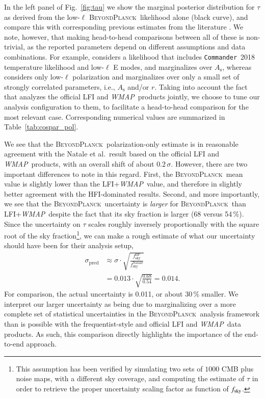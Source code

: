 \documentclass[twocolumn]{aa}
\def\WMAP{\textit{WMAP}}
\def\commander{\texttt{Commander}}
\newcommand{\BP}{\textsc{BeyondPlanck}}
\begin{document}
In the left panel of Fig.~\ref{fig:tau} we show the marginal posterior
distribution for $\tau$ as derived from the low-$\ell$ \BP\ likelihood
alone (black curve), and compare this with corresponding previous
estimates from the literature \citep{hinshaw2012, planck2016-l06,
  natale:2020,pagano:2020}. We note, however, that making head-to-head
comparisons between all of these is non-trivial, as the reported
parameters depend on different assumptions and data combinations. For
example, \citet{pagano:2020} considers a likelihood that includes
\commander\ 2018 temperature likelihood and low-$\ell$ E modes, 
and marginalizes over $A_{\mathrm{s}}$, whereas \citet{natale:2020} considers only
low-$\ell$ polarization and marginalizes over only a small set of
strongly correlated parameters, i.e., $A_{\mathrm{s}}$ and/or
$r$. Taking into account the fact that \citet{natale:2020} analyzes
the official LFI and \WMAP\ products jointly, we choose to tune our
analysis configuration to them, to facilitate a head-to-head
comparison for the most relevant case. Corresponding numerical values
are summarized in Table~\ref{tab:cospar_pol}.

We see that the \BP\ polarization-only estimate is in reasonable
agreement with the Natale et al.\ result based on the official LFI and
\WMAP\ products, with an overall shift of about
$0.2\,\sigma$. However, there are two important differences to note in
this regard. First, the \BP\ mean value is slightly lower than the
LFI+\WMAP\ value, and therefore in slightly better agreement with the
HFI-dominated results. Second, and more importantly, we see that the
\BP\ uncertainty is \emph{larger} for \BP\ than LFI+\WMAP\, despite
the fact that its sky fraction is larger (68 versus 54\,\%). Since the
uncertainty on $\tau$ scales roughly inversely proportionally with the
square root of the sky fraction\footnote{This assumption has been verified
by simulating two sets of $1000$ CMB plus noise maps, with a different
sky coverage, and computing the estimate of $\tau$ in order to retrieve
the proper uncertainty scaling factor as function of $f_{\rm{sky}}$.}, we can
make a rough estimate of what our uncertainty should have been for
their analysis setup,
\begin{align}
  \sigma_{\mathrm{pred}} &\approx
  \sigma\cdot\sqrt{\frac{f_{\mathrm{sky}}^{\mathrm{BP}}}{f_{\mathrm{sky}}^{\mathrm{Natale}}}}\\\
  &= 0.013\cdot \sqrt{\frac{0.68}{0.54}}= 0.014.
\end{align}
For comparison, the actual \citet{natale:2020} uncertainty is 0.011, or about 30\,\%
smaller. We interpret our larger uncertainty as being due to marginalizing over a more
complete set of statistical uncertainties in the \BP\ analysis
framework than is possible with the frequentist-style and official LFI
and \WMAP\ data products. As such, this comparison directly highlights
the importance of the end-to-end approach.
\end{document}
